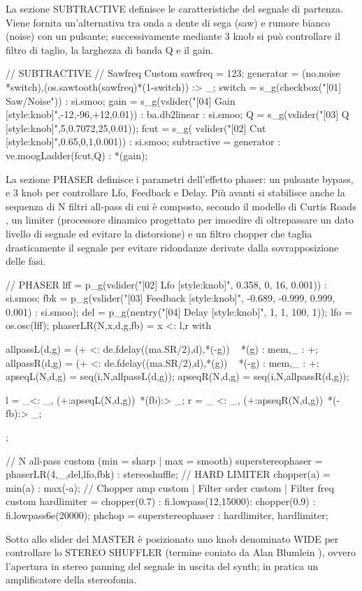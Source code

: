 \documentclass[
	a4paper,
	twocolumn
	]{article}
\begin{document}
La sezione SUBTRACTIVE definisce le caratteristiche del segnale di partenza.
Viene fornita un'alternativa tra onda a dente di sega (saw) e rumore bianco
(noise) con un pulsante; successivamente mediante 3 knob si può controllare il
filtro di taglio, la larghezza di banda Q e il gain.

// SUBTRACTIVE
// Sawfreq Custom
sawfreq = 123;
generator = (no.noise *switch),(os.sawtooth(sawfreq)*(1-switch)) :> _;
switch = s_g(checkbox("[01] Saw/Noise")) : si.smoo;
gain = s_g(vslider("[04] Gain [style:knob]",-12,-96,+12,0.01)) : ba.db2linear
			: si.smoo;
Q = s_g(vslider("[03] Q [style:knob]",5,0.7072,25,0.01));
fcut = s_g( vslider("[02] Cut [style:knob]",0.65,0,1,0.001)) : si.smoo;
subtractive = generator : ve.moogLadder(fcut,Q) : *(gain);

La sezione PHASER definisce i parametri dell'effetto phaser: un pulsante bypass,
e 3 knob per controllare Lfo, Feedback e Delay. Più avanti si stabilisce anche
la sequenza di N filtri all-pass di cui è composto, secondo il modello di Curtis
Roads \cite{cr96cmt}, un limiter (processore dinamico progettato per imoedire di
oltrepassare un dato livello di segnale ed evitare la distorsione) e un filtro
chopper che taglia drasticamente il segnale per evitare ridondanze derivate
dalla sovrapposizione delle fasi.

// PHASER
lff = p_g(vslider("[02] Lfo [style:knob]", 0.358, 0, 16, 0.001)) : si.smoo;
fbk = p_g(vslider("[03] Feedback [style:knob]", -0.689, -0.999, 0.999, 0.001)
			: si.smoo);
del = p_g(nentry("[04] Delay [style:knob]", 1, 1, 100, 1));
lfo = os.osc(lff);
phaserLR(N,x,d,g,fb) = x <: l,r
with{
  allpassL(d,g) = (+ <: de.fdelay((ma.SR/2),d),*(-g)) ~ *(g) : mem,_ : +;
  allpassR(d,g) = (+ <: de.fdelay((ma.SR/2),d),*(g)) ~ *(-g) : mem,_ : +;
  apseqL(N,d,g) = seq(i,N,allpassL(d,g));
  apseqR(N,d,g) = seq(i,N,allpassR(d,g));

  l = _<: _, (+:apseqL(N,d,g))~*(fb):> _;
  r = _ <: _, (+:apseqR(N,d,g))~*(-fb):> _;
};

// N all-pass custom (min = sharp | max = smooth)
superstereophaser = phaserLR(4,_,del,lfo,fbk) : stereoshuffle;
// HARD LIMITER
chopper(a) = min(a) : max(-a);
// Chopper amp custom | Filter order custom | Filter freq custom
hardlimiter = chopper(0.7) : fi.lowpass(12,15000): chopper(0.9) :
			fi.lowpass6e(20000);
phchop = superstereophaser : hardlimiter, hardlimiter;


Sotto allo slider del MASTER è posizionato uno knob denominato WIDE per
controllare lo STEREO SHUFFLER (termine coniato da Alan Blumlein \cite{ab58} ),
ovvero l'apertura in stereo panning del segnale in uscita del synth; in pratica
un amplificatore della stereofonia.
\end{document}
